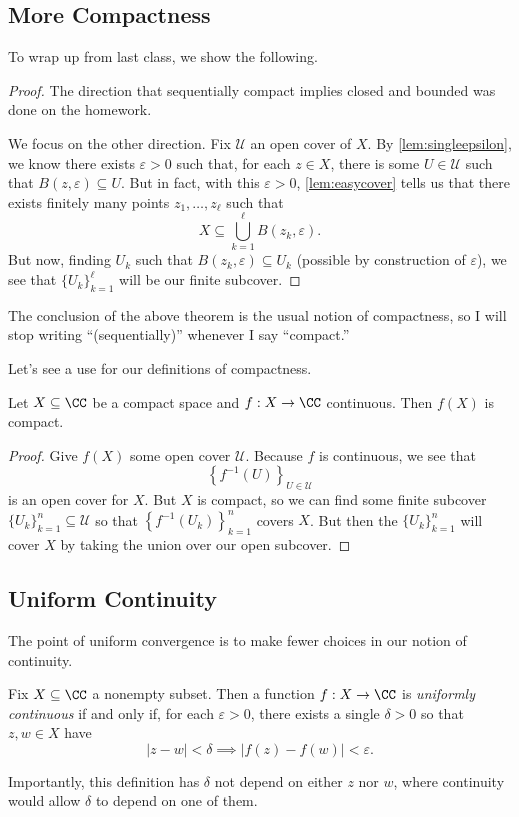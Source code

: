 
\subsection{More Compactness}
To wrap up from last class, we show the following.
\heineborel*
\begin{proof}
	The direction that sequentially compact implies closed and bounded was done on the homework.
	
	We focus on the other direction. Fix $\mathcal U$ an open cover of $X$. By \autoref{lem:singleepsilon}, we know there exists $\varepsilon>0$ such that, for each $z\in X$, there is some $U\in\mathcal U$ such that $B(z,\varepsilon)\subseteq U$. But in fact, with this $\varepsilon>0$, \autoref{lem:easycover} tells us that there exists finitely many points $z_1,\ldots,z_\ell$ such that
	\[X\subseteq\bigcup_{k=1}^\ell B(z_k,\varepsilon).\]
	But now, finding $U_k$ such that $B(z_k,\varepsilon)\subseteq U_k$ (possible by construction of $\varepsilon$), we see that $\{U_k\}_{k=1}^\ell$ will be our finite subcover.
\end{proof}
\begin{remark}
	The conclusion of the above theorem is the usual notion of compactness, so I will stop writing ``(sequentially)'' whenever I say ``compact.''
\end{remark}
Let's see a use for our definitions of compactness.
\begin{corollary}
	Let $X\subseteq\CC$ be a compact space and $f:X\to\CC$ continuous. Then $f(X)$ is compact.
\end{corollary}
\begin{proof}
	Give $f(X)$ some open cover $\mathcal U$. Because $f$ is continuous, we see that
	\[\left\{f^{-1}(U)\right\}_{U\in\mathcal U}\]
	is an open cover for $X$. But $X$ is compact, so we can find some finite subcover $\{U_k\}_{k=1}^n\subseteq\mathcal U$ so that $\left\{f^{-1}(U_k)\right\}_{k=1}^n$ covers $X$. But then the $\{U_k\}_{k=1}^n$ will cover $X$ by taking the union over our open subcover.
\end{proof}

\subsection{Uniform Continuity}
The point of uniform convergence is to make fewer choices in our notion of continuity.
\begin{definition}
	Fix $X\subseteq\CC$ a nonempty subset. Then a function $f:X\to\CC$ is \textit{uniformly continuous} if and only if, for each $\varepsilon>0$, there exists a single $\delta>0$ so that $z,w\in X$ have
	\[|z-w|<\delta\implies|f(z)-f(w)|<\varepsilon.\]
\end{definition}
Importantly, this definition has $\delta$ not depend on either $z$ nor $w$, where continuity would allow $\delta$ to depend on one of them.

